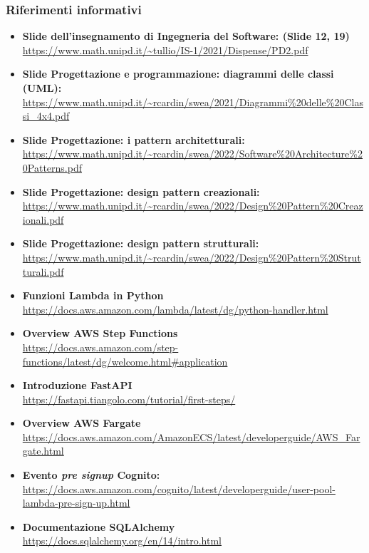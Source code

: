 \subsubsection{Riferimenti informativi}
\begin{itemize}
	\item 
    {\textbf{Slide dell'insegnamento di Ingegneria del Software: (Slide 12, 19)}}\\\url{https://www.math.unipd.it/~tullio/IS-1/2021/Dispense/PD2.pdf}
	\item
	{\textbf{Slide Progettazione e programmazione: diagrammi delle classi (UML):}}\\\url{https://www.math.unipd.it/~rcardin/swea/2021/Diagrammi%20delle%20Classi_4x4.pdf}
	\item
	{\textbf{Slide Progettazione: i pattern architetturali:}}\\\url{https://www.math.unipd.it/~rcardin/swea/2022/Software%20Architecture%20Patterns.pdf}
	\item 
	{\textbf{Slide Progettazione: design pattern creazionali:}}\\\url{https://www.math.unipd.it/~rcardin/swea/2022/Design%20Pattern%20Creazionali.pdf}
	\item 
	{\textbf{Slide Progettazione: design pattern strutturali:}}\\\url{https://www.math.unipd.it/~rcardin/swea/2022/Design%20Pattern%20Strutturali.pdf}
	\item 
	{\textbf{Funzioni Lambda in Python}}\\\url{https://docs.aws.amazon.com/lambda/latest/dg/python-handler.html}
	\item 
	{\textbf{Overview AWS Step Functions}}\\\url{https://docs.aws.amazon.com/step-functions/latest/dg/welcome.html#application}
	\item 
	{\textbf{Introduzione FastAPI}}\\\url{https://fastapi.tiangolo.com/tutorial/first-steps/}
	\item
	{\textbf{Overview AWS Fargate}}\\\url{https://docs.aws.amazon.com/AmazonECS/latest/developerguide/AWS_Fargate.html}
	\item 
	{\textbf{Evento \textit{pre signup} Cognito:}}\\\url{https://docs.aws.amazon.com/cognito/latest/developerguide/user-pool-lambda-pre-sign-up.html}
	\item 
	{\textbf{Documentazione SQLAlchemy}}\\\url{https://docs.sqlalchemy.org/en/14/intro.html}

\end{itemize}
